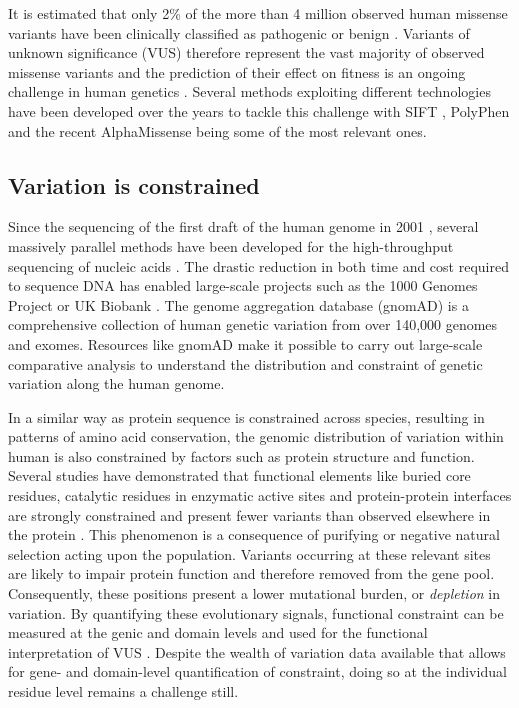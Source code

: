 It is estimated that only 2\% of the more than 4 million observed human missense variants have been clinically classified as pathogenic or benign \cite{LEK_2016_EXAC}. Variants of unknown significance (VUS) therefore represent the vast majority of observed missense variants and the prediction of their effect on fitness is an ongoing challenge in human genetics \cite{MCLAREN_2016_VEP}. Several methods exploiting different technologies have been developed over the years to tackle this challenge with SIFT \cite{KUMAR_2009_SIFT}, PolyPhen \cite{ADZHUBEI_2013_POLYPHEN} and the recent AlphaMissense \cite{CHENG_2023_ALPHAMISSENSE} being some of the most relevant ones.

\subsection{Variation is constrained}

Since the sequencing of the first draft of the human genome in 2001 \cite{CONSORTIUM_2001_GENOME}, several massively parallel methods have been developed for the high-throughput sequencing of nucleic acids \cite{KASIANOWICZ_1996_NANOPORE, MARGULIES_2005_PYROSEQUENCING, BENTLEY_2008_ILLUMINA, EID_2009_PACBIO, ROTHBERG_2011_IONTORRENT}. The drastic reduction in both time and cost required to sequence DNA has enabled large-scale projects such as the 1000 Genomes Project \cite{AUTON_2015_1000KG} or UK Biobank \cite{BYCROFT_2018_UKBIOBANK}. The genome aggregation database (gnomAD) is a comprehensive collection of human genetic variation from over 140,000 genomes and exomes. Resources like gnomAD make it possible to carry out large-scale comparative analysis to understand the distribution and constraint of genetic variation along the human genome.

In a similar way as protein sequence is constrained across species, resulting in patterns of amino acid conservation, the genomic distribution of variation within human is also constrained by factors such as protein structure and function. Several studies have demonstrated that functional elements like buried core residues, catalytic residues in enzymatic active sites and protein-protein interfaces are strongly constrained and present fewer variants than observed elsewhere in the protein \cite{GONG_2010_CONSTRAINT, BEER_2013_CONSTRAINT, DAVID_2015_CONSTRAINT, SIVLEY_2018_CONSTRAINT}. This phenomenon is a consequence of purifying or negative natural selection acting upon the population. Variants occurring at these relevant sites are likely to impair protein function and therefore removed from the gene pool. Consequently, these positions present a lower mutational burden, or \textit{depletion} in variation. By quantifying these evolutionary signals, functional constraint can be measured at the genic \cite{PETROVSKI_2013_CONSTRAINT} and domain \cite{GUSSOW_2016_CONSTRAINT} levels and used for the functional interpretation of VUS \cite{LI_2022_CONSTRAINT}. Despite the wealth of variation data available that allows for gene- and domain-level quantification of constraint, doing so at the individual residue level remains a challenge still.

